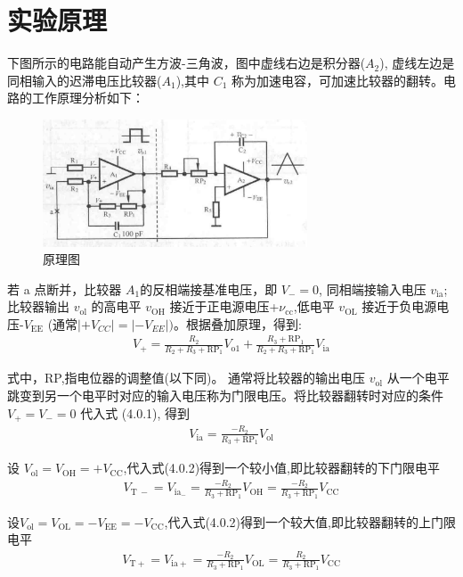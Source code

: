 \documentclass[a4paper,11pt,UTF8]{article}
\numberwithin{equation}{subsection}
\begin{document}
\section{实验原理}
下图所示的电路能自动产生方波-三角波，图中虚线右边是积分器($A_2$), 虚线左边是同相输入的迟滞电压比较器($A_1$),其中 $C_1$ 称为加速电容，可加速比较器的翻转。电路的工作原理分析如下：
\begin{figure}[H]
	\centering
	\includegraphics[width=0.7\textwidth]{4}
	\caption{原理图}
\end{figure}
若 a 点断并，比较器 $A_1$的反相端接基准电压，即 $V_-=0$, 同相端接输入电压 $v_\mathrm{ia}$; 比较器输出 $v_\mathrm{ol}$ 的高电平 $v_\mathrm{OH}$ 接近于正电源电压+$\nu_\mathrm{cc}$,低电平 $v_\mathrm{OL}$ 接近于负电源电压-$V_\mathrm{EE}$ (通常$|+V_{CC}|=|-V_{EE}|)$。根据叠加原理，得到:
\begin{align}
	V_{+}=\frac{R_{2}}{R_{2}+R_{3}+\mathrm{RP}_{1}}V_{\mathrm{o1}}+\frac{R_{3}+\mathrm{RP}_{1}}{R_{2}+R_{3}+\mathrm{RP}_{1}}V_{\mathrm{ia}}
\end{align}

式中，RP,指电位器的调整值(以下同)。
通常将比较器的输出电压 $v_\mathrm{ol}$ 从一个电平跳变到另一个电平时对应的输入电压称为门限电压。将比较器翻转时对应的条件 $V_+=V_-=0$ 代入式 (4.0.1), 得到
\begin{align}
	V_{\mathrm{ia}}=\frac{-R_{2}}{R_{3}+\mathrm{RP}_{1}}V_{\mathrm{ol}}
\end{align}

设 $V_{\mathrm{ol}}=V_{\mathrm{OH}}=+V_{\mathrm{CC}}$,代入式(4.0.2)得到一个较小值,即比较器翻转的下门限电平
\begin{align}
	V_{\mathrm{T~-}}=V_{\mathrm{ia}_{-}}=\frac{-R_{2}}{R_{3}+\mathrm{RP}_{1}}V_{\mathrm{OH}}=\frac{-R_{2}}{R_{3}+\mathrm{RP}_{1}}V_{\mathrm{CC}}
\end{align}

设$V_{\mathrm{ol}}=V_{\mathrm{OL}}=-V_{\mathrm{EE}}=-V_{\mathrm{CC}}$,代入式(4.0.2)得到一个较大值,即比较器翻转的上门限电平
\begin{align}
	V_{\mathrm{T}+}=V_{\mathrm{ia}+}=\frac{-R_{2}}{R_{3}+\mathrm{RP}_{1}}V_{\mathrm{OL}}=\frac{R_{2}}{R_{3}+\mathrm{RP}_{1}}V_{\mathrm{CC}}
\end{align}
\end{document}
